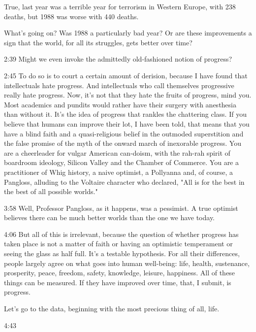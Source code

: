 \documentclass[10pt,titlepage]{article}
\begin{document}
True, last year was a terrible year for terrorism in Western Europe,
with 238 deaths,
but 1988 was worse with 440 deaths.

What's going on?
Was 1988 a particularly bad year?
Or are these improvements a sign that the world, for all its struggles,
gets better over time?

2:39
Might we even invoke the admittedly old-fashioned notion of progress?

2:45
To do so is to court a certain amount of derision,
because I have found that intellectuals hate progress.
And intellectuals who call themselves progressive really hate progress.
Now, it's not that they hate the fruits of progress, mind you.
Most academics and pundits
would rather have their surgery with anesthesia than without it.
It's the idea of progress that rankles the chattering class.
If you believe that humans can improve their lot, I have been told,
that means that you have a blind faith
and a quasi-religious belief in the outmoded superstition
and the false promise of the myth of the onward march
of inexorable progress.
You are a cheerleader for vulgar American can-doism,
with the rah-rah spirit of boardroom ideology,
Silicon Valley and the Chamber of Commerce.
You are a practitioner of Whig history,
a naive optimist, a Pollyanna and, of course, a Pangloss,
alluding to the Voltaire character who declared,
"All is for the best in the best of all possible worlds."

3:58
Well, Professor Pangloss, as it happens, was a pessimist.
A true optimist believes there can be much better worlds
than the one we have today.

4:06
But all of this is irrelevant,
because the question of whether progress has taken place
is not a matter of faith
or having an optimistic temperament or seeing the glass as half full.
It's a testable hypothesis.
For all their differences,
people largely agree on what goes into human well-being:
life, health, sustenance, prosperity, peace, freedom, safety, knowledge,
leisure, happiness.
All of these things can be measured.
If they have improved over time, that, I submit, is progress.

Let's go to the data,
beginning with the most precious thing of all, life.

4:43
\end{document}
